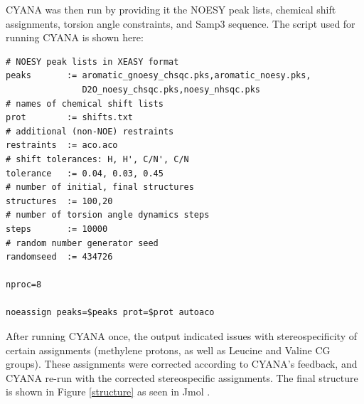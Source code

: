 CYANA was then run by providing it the NOESY peak lists, chemical shift
assignments, torsion angle constraints, and Samp3 sequence.  The script
used for running CYANA is shown here:
\begin{verbatim}
# NOESY peak lists in XEASY format
peaks       := aromatic_gnoesy_chsqc.pks,aromatic_noesy.pks,
               D2O_noesy_chsqc.pks,noesy_nhsqc.pks
# names of chemical shift lists
prot        := shifts.txt                
# additional (non-NOE) restraints
restraints  := aco.aco                   
# shift tolerances: H, H', C/N', C/N
tolerance   := 0.04, 0.03, 0.45          
# number of initial, final structures
structures  := 100,20                    
# number of torsion angle dynamics steps
steps       := 10000                    
# random number generator seed
randomseed  := 434726                    

nproc=8

noeassign peaks=$peaks prot=$prot autoaco
\end{verbatim}
After running CYANA once, the output indicated issues with stereospecificity
of certain assignments (methylene protons, as well as Leucine and Valine
CG groups).  These assignments were corrected according to CYANA's feedback,
and CYANA re-run with the corrected stereospecific assignments.
The final structure is shown in Figure \ref{structure} as seen in 
Jmol \cite{jmol}.




